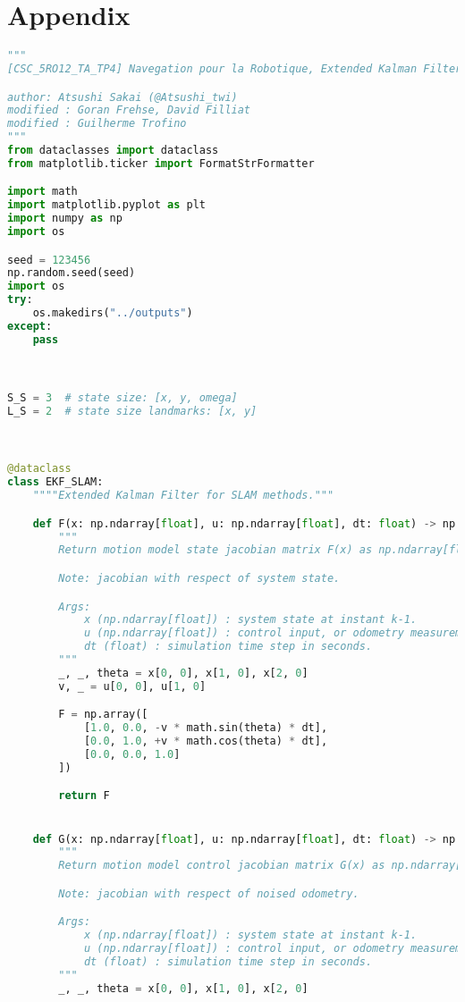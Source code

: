 \documentclass[../CSC_5RO12_TA_TP4.tex]{subfiles}
\begin{document}
\section{Appendix}
\begin{scriptsize}\mycode
	\begin{lstlisting}[language=Python]
"""
[CSC_5RO12_TA_TP4] Navegation pour la Robotique, Extended Kalman Filter SLAM

author: Atsushi Sakai (@Atsushi_twi)
modified : Goran Frehse, David Filliat
modified : Guilherme Trofino
"""
from dataclasses import dataclass
from matplotlib.ticker import FormatStrFormatter

import math
import matplotlib.pyplot as plt
import numpy as np
import os

seed = 123456
np.random.seed(seed)
import os
try:
    os.makedirs("../outputs")
except:
    pass



S_S = 3  # state size: [x, y, omega]
L_S = 2  # state size landmarks: [x, y]



@dataclass
class EKF_SLAM:
    """"Extended Kalman Filter for SLAM methods."""

    def F(x: np.ndarray[float], u: np.ndarray[float], dt: float) -> np.ndarray[float]:
        """
        Return motion model state jacobian matrix F(x) as np.ndarray[float].

        Note: jacobian with respect of system state.

        Args:
            x (np.ndarray[float]) : system state at instant k-1.
            u (np.ndarray[float]) : control input, or odometry measurement, at instant k.
            dt (float) : simulation time step in seconds.
        """
        _, _, theta = x[0, 0], x[1, 0], x[2, 0]
        v, _ = u[0, 0], u[1, 0]

        F = np.array([
            [1.0, 0.0, -v * math.sin(theta) * dt],
            [0.0, 1.0, +v * math.cos(theta) * dt],
            [0.0, 0.0, 1.0]
        ])

        return F


    def G(x: np.ndarray[float], u: np.ndarray[float], dt: float) -> np.ndarray[float]:
        """
        Return motion model control jacobian matrix G(x) as np.ndarray[float].

        Note: jacobian with respect of noised odometry.

        Args:
            x (np.ndarray[float]) : system state at instant k-1.
            u (np.ndarray[float]) : control input, or odometry measurement, at instant k.
            dt (float) : simulation time step in seconds.
        """
        _, _, theta = x[0, 0], x[1, 0], x[2, 0]


\end{lstlisting}
\end{scriptsize}
\end{document}
